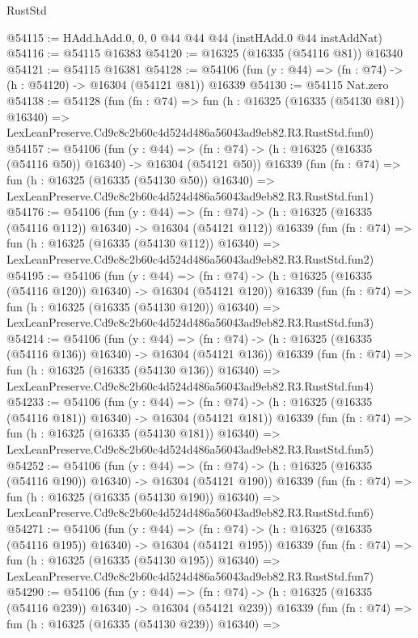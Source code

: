 \begin{lexlean}{RustStd}
\begin{coremodule}
@54115 := HAdd.hAdd.{0, 0, 0} @44 @44 @44 (instHAdd.{0} @44 instAddNat)
@54116 := @54115 @16383
@54120 := @16325 (@16335 (@54116 @81)) @16340
@54121 := @54115 @16381
@54128 := @54106 (fun (y : @44) => (fn : @74) -> (h : @54120) -> @16304 (@54121 @81)) @16339
@54130 := @54115 Nat.zero
@54138 := @54128
    (fun (fn : @74) =>
    fun (h : @16325 (@16335 (@54130 @81)) @16340) =>
    LexLeanPreserve.Cd9c8c2b60c4d524d486a56043ad9eb82.R3.RustStd.fun0)
@54157 := @54106
    (fun (y : @44) =>
    (fn : @74) -> (h : @16325 (@16335 (@54116 @50)) @16340) -> @16304 (@54121 @50))
    @16339
    (fun (fn : @74) =>
    fun (h : @16325 (@16335 (@54130 @50)) @16340) =>
    LexLeanPreserve.Cd9c8c2b60c4d524d486a56043ad9eb82.R3.RustStd.fun1)
@54176 := @54106
    (fun (y : @44) =>
    (fn : @74) -> (h : @16325 (@16335 (@54116 @112)) @16340) -> @16304 (@54121 @112))
    @16339
    (fun (fn : @74) =>
    fun (h : @16325 (@16335 (@54130 @112)) @16340) =>
    LexLeanPreserve.Cd9c8c2b60c4d524d486a56043ad9eb82.R3.RustStd.fun2)
@54195 := @54106
    (fun (y : @44) =>
    (fn : @74) -> (h : @16325 (@16335 (@54116 @120)) @16340) -> @16304 (@54121 @120))
    @16339
    (fun (fn : @74) =>
    fun (h : @16325 (@16335 (@54130 @120)) @16340) =>
    LexLeanPreserve.Cd9c8c2b60c4d524d486a56043ad9eb82.R3.RustStd.fun3)
@54214 := @54106
    (fun (y : @44) =>
    (fn : @74) -> (h : @16325 (@16335 (@54116 @136)) @16340) -> @16304 (@54121 @136))
    @16339
    (fun (fn : @74) =>
    fun (h : @16325 (@16335 (@54130 @136)) @16340) =>
    LexLeanPreserve.Cd9c8c2b60c4d524d486a56043ad9eb82.R3.RustStd.fun4)
@54233 := @54106
    (fun (y : @44) =>
    (fn : @74) -> (h : @16325 (@16335 (@54116 @181)) @16340) -> @16304 (@54121 @181))
    @16339
    (fun (fn : @74) =>
    fun (h : @16325 (@16335 (@54130 @181)) @16340) =>
    LexLeanPreserve.Cd9c8c2b60c4d524d486a56043ad9eb82.R3.RustStd.fun5)
@54252 := @54106
    (fun (y : @44) =>
    (fn : @74) -> (h : @16325 (@16335 (@54116 @190)) @16340) -> @16304 (@54121 @190))
    @16339
    (fun (fn : @74) =>
    fun (h : @16325 (@16335 (@54130 @190)) @16340) =>
    LexLeanPreserve.Cd9c8c2b60c4d524d486a56043ad9eb82.R3.RustStd.fun6)
@54271 := @54106
    (fun (y : @44) =>
    (fn : @74) -> (h : @16325 (@16335 (@54116 @195)) @16340) -> @16304 (@54121 @195))
    @16339
    (fun (fn : @74) =>
    fun (h : @16325 (@16335 (@54130 @195)) @16340) =>
    LexLeanPreserve.Cd9c8c2b60c4d524d486a56043ad9eb82.R3.RustStd.fun7)
@54290 := @54106
    (fun (y : @44) =>
    (fn : @74) -> (h : @16325 (@16335 (@54116 @239)) @16340) -> @16304 (@54121 @239))
    @16339
    (fun (fn : @74) =>
    fun (h : @16325 (@16335 (@54130 @239)) @16340) =>

\end{coremodule}
\end{lexlean}
